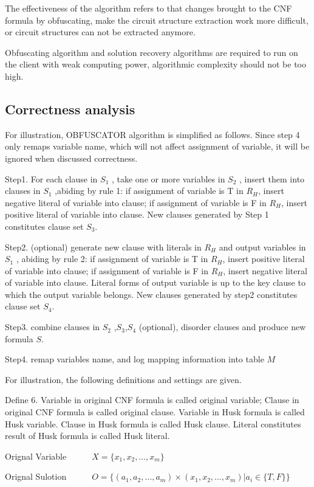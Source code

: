 \documentclass[runningheads,a4paper]{llncs}
\begin{document}
The effectiveness of the algorithm refers to that changes brought to the CNF formula by obfuscating, make the circuit structure extraction work more difficult, 
or circuit structures can not be extracted anymore. 

Obfuscating algorithm and solution recovery algorithms are required to run on the client with weak computing power, algorithmic complexity should not be too high.
\subsection{Correctness analysis}

For illustration, OBFUSCATOR algorithm is simplified as follows. Since step 4 only remaps variable name, which will not affect assignment of variable, 
it will be ignored when discussed correctness.

Step1. For each clause in $S_1$  , take one or more variables in $S_2$ , insert them into clauses in $S_1$ ,abiding by rule 1:
if assignment of variable is T in $R_H$, insert negative literal of variable into clause;
if assignment of variable is F in $R_H$, insert positive literal of variable into clause. 
New clauses generated by Step 1 constitutes clause set $S_3$.

Step2. (optional) generate new clause with literals in $R_H$ and output variables in $S_1$ , abiding by rule 2: 
if assignment of variable is T in $R_H$, insert positive literal of variable into clause;
if assignment of variable is F in $R_H$, insert negative literal of variable into clause.
Literal forms of output variable is up to the key clause to which the output variable belongs. 
New clauses generated by step2 constitutes clause set $S_4$.

Step3. combine clauses in $S_2$ ,$S_3$,$S_4$ (optional), disorder clauses and produce new formula $S$.

Step4. remap variables name, and log mapping information into table $M$ 

For illustration, the following definitions and settings are given.

\noindent Define 6. Variable in original CNF formula is called original variable; Clause in original CNF formula is called original clause. 
Variable in Husk formula is called Husk variable. Clause in Husk formula is called Husk clause. Literal constitutes result of Husk formula is called Husk literal.

Orignal Variable~~~~~~$X=\{x_1,x_2,\dots,x_m\}$

Orignal Sulotion~~~~~~$O=\{(a_1,a_2,\dots,a_m)\times(x_1,x_2,\dots,x_m) | a_i∈ \{T,F\}\}$
\end{document}
